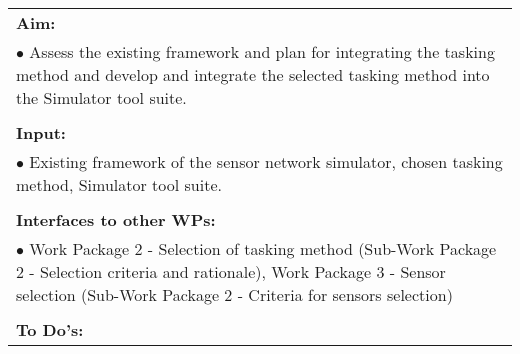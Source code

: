 \begin{table}[!h]
\begin{center}
\begin{tabular}{|p{35mm}||p{55mm}|p{50mm}||p{40mm}|}
      \hline\hline
      \multicolumn{4}{|p{150mm}|}{\textbf{Aim:}}                                                                                                                                                            \\
      \multicolumn{4}{|p{150mm}|}{$\bullet$ Assess the existing framework and plan for integrating the tasking method and develop and integrate the selected tasking method into the Simulator tool suite. }                                                   \\
      \multicolumn{4}{|p{150mm}|}{}                                                                                                                                                                           \\
      \multicolumn{4}{|p{150mm}|}{\textbf{Input:}}                                                                                                                                                            \\
      \multicolumn{4}{|p{150mm}|}{$\bullet$ Existing framework of the sensor network simulator, chosen tasking method, Simulator tool suite.}                                                                                                                                 \\
      \multicolumn{4}{|p{150mm}|}{}                                                                                                                                                                           \\
      \multicolumn{4}{|p{150mm}|}{\textbf{Interfaces to other WPs:}}                                                                                                                                    \\
      \multicolumn{4}{|p{150mm}|}{$\bullet$ Work Package 2 - Selection of tasking method (Sub-Work Package 2 - Selection criteria and rationale), Work Package 3 - Sensor selection (Sub-Work Package 2 - Criteria for sensors selection)}                                                                                              \\
      \multicolumn{4}{|p{150mm}|}{}                                                                                                                                                                           \\
      \multicolumn{4}{|p{150mm}|}{\textbf{To Do's:}}                                                                                                                                                         \\

\end{tabular}
\end{center}
\end{table}
